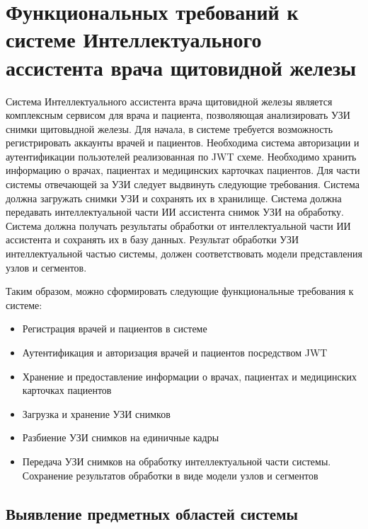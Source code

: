 \section{Функциональных требований к системе Интеллектуального ассистента врача щитовидной железы}

Система Интеллектуального ассистента врача щитовидной железы является комплексным сервисом для врача и пациента, позволяющая анализировать УЗИ снимки щитовыдной железы.
Для начала, в системе требуется возможность регистрировать аккаунты врачей и пациентов. Необходима система авторизации и аутентификации пользотелей реализованная по JWT схеме. 
Необходимо хранить информацию о врачах, пациентах и медицинских карточках пациентов.
Для части системы отвечающей за УЗИ следует выдвинуть следующие требования. Система должна загружать снимки УЗИ и сохранять их в хранилище. 
Система должна передавать интеллектуальной части ИИ ассистента снимок УЗИ на обработку. 
Система должна получать результаты обработки от интеллектуальной части ИИ ассистента и сохранять их в базу данных. Результат обработки УЗИ интеллектуальной частью системы, должен
соответствовать модели представления узлов и сегментов.

Таким образом, можно сформировать следующие функциональные требования к системе\cite{evans2003ddd}:
\begin{itemize}
  \item Регистрация врачей и пациентов в системе
  \item Аутентификация и авторизация врачей и пациентов посредством JWT 
  \item Хранение и предоставление информации о врачах, пациентах и медицинских карточках пациентов
  \item Загрузка и хранение УЗИ снимков
  \item Разбиение УЗИ снимков на единичные кадры
  \item Передача УЗИ снимков на обработку интеллектуальной части системы. Сохранение результатов обработки в виде модели узлов и сегментов
\end{itemize}

\subsection{Выявление предметных областей системы}

